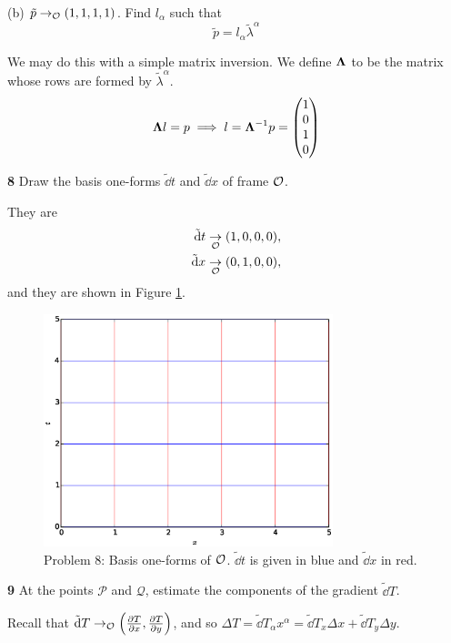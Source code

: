 \documentclass[gr-notes.tex]{subfiles}
\begin{document}
(b) $\tilde{p} \to_{\mathcal{O}} (1, 1, 1, 1)$. Find $l_\alpha$ such that
%
\begin{displaymath}
  \tilde{p} = l_\alpha \tilde{\lambda}^\alpha
\end{displaymath}

We may do this with a simple matrix inversion. We define $\vb\Lambda$ to be the matrix whose rows are formed by $\tilde{\lambda}^\alpha$.
%
\begin{displaymath}
  \vb\Lambda l = p \implies
  l = \vb\Lambda^{-1} p =
  \mqty( 1 \\ 0 \\ 1 \\ 0 )
\end{displaymath}




\textbf{8}
Draw the basis one-forms $\tilde{\dd}t$ and $\tilde{\dd}x$ of frame $\mathcal{O}$.

They are
%
\begin{align*}
  \tilde{\dd}t &\underset{\mathcal{O}}{\to} (1, 0, 0, 0), \\
  \tilde{\dd}x &\underset{\mathcal{O}}{\to} (0, 1, 0, 0),
\end{align*}
%
and they are shown in Figure \ref{fig:ch3-problem-8}.

\begin{figure}[h]
  \centering
  \includegraphics[width=0.75\textwidth]{img/ch3_problem_8}
  \caption{Problem 8: Basis one-forms of $\mathcal{O}$. $\tilde{\dd}t$ is given in blue and $\tilde{\dd}x$ in red.}
  \label{fig:ch3-problem-8}
\end{figure}


\textbf{9}
At the points $\mathcal{P}$ and $\mathcal{Q}$, estimate the components of the gradient $\tilde{\dd}T$.

Recall that $\tilde{\dd}T \to_{\mathcal{O}} \qty(\pdv{T}{x}, \pdv{T}{y})$, and so $\Delta T = \tilde{\dd}T_\alpha x^\alpha = \tilde{\dd}T_x \Delta x + \tilde{\dd}T_y \Delta y$.
\end{document}

